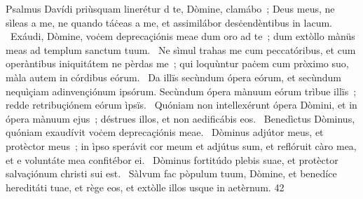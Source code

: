 { Psalmus Davídi priùsquam linerétur}
{%
d te, Dòmine, clamábo~; Deus meus, ne sìleas a me, ne quando táċeas a me, et assimilábor desċendèntibus in lacum. 
~Exáudi, Dòmine, voċem deprecaçiónis meae dum oro ad te~; dum extòllo mànüs meas ad templum sanctum tuum. 
~Ne sìmul trahas me cum peccatóribus, et cum operàntibus iniquitátem ne pèrdas me~; qui loquùntur paċem cum pròximo suo, màla autem in córdibus eórum. 
~Da illïs secùndum ópera eórum, et secùndum nequìçiam adinvençiónum ipsórum. Secùndum ópera mànuum eórum trìbue illïs~; redde retribuçiónem eórum ìpsïs. 
~Quóniam non intellexérunt ópera Dòmini, et in ópera mànuum ejus~; déstrues illos, et non aedificábis eos. 
~Benedìctus Dòminus, quóniam exaudívit voċem deprecaçiónis meae. 
~Dòminus adjútor meus, et protèctor meus~; in ìpso sperávit cor meum et adjútus sum, et reflóruit càro mea, et e voluntáte mea confitébor ei. 
~Dòminus fortitúdo plebis suae, et protèctor salvaçiónum christi sui est. 
~Sàlvum fac pòpulum tuum, Dòmine, et benedíce hereditáti tuae, et rège eos, et extòlle illos usque in aetèrnum.}
{4}{2}
